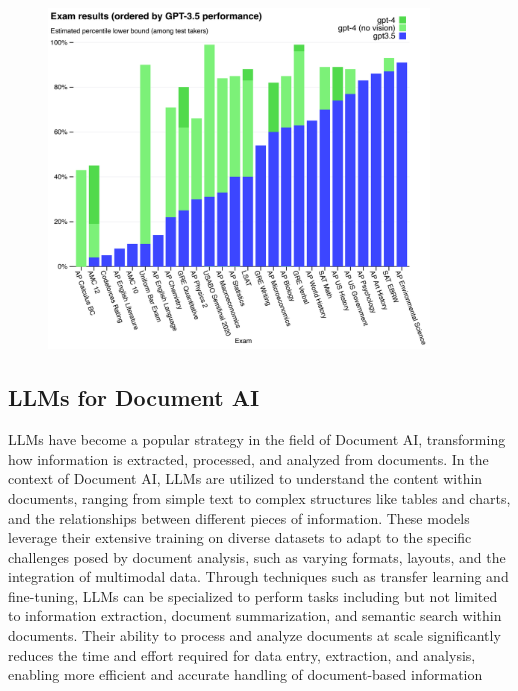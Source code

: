 \documentclass[english, 12pt, a4paper, elec, utf8, a-2b, online]{aaltothesis}
\begin{document}
\begin{figure}[H]
    \centering
    \includegraphics[width=0.9\textwidth]{images/gpt_exam_results.png}
    \caption{}
    \label{fig:gpt_exam_results}
\end{figure}

\subsection{LLMs for Document AI}

\ac{LLM}s have become a popular strategy in the field of Document AI, transforming how information is extracted, processed, and analyzed from documents.
In the context of Document AI, \ac{LLM}s are utilized to understand the content within documents, ranging from simple text to complex structures like tables and charts, and the relationships between different pieces of information.
These models leverage their extensive training on diverse datasets to adapt to the specific challenges posed by document analysis, such as varying formats, layouts, and the integration of multimodal data.
Through techniques such as transfer learning and fine-tuning, \ac{LLM}s can be specialized to perform tasks including but not limited to information extraction, document summarization, and semantic search within documents.
Their ability to process and analyze documents at scale significantly reduces the time and effort required for data entry, extraction, and analysis, enabling more efficient and accurate handling of document-based information %
\end{document}
